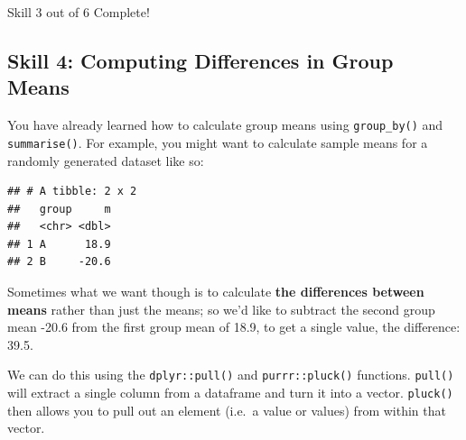 \documentclass[]{book}
\newenvironment{Shaded}{\begin{snugshade}}{\end{snugshade}}
\newcommand{\DataTypeTok}[1]{\textcolor[rgb]{0.13,0.29,0.53}{#1}}
\newcommand{\DecValTok}[1]{\textcolor[rgb]{0.00,0.00,0.81}{#1}}
\newcommand{\KeywordTok}[1]{\textcolor[rgb]{0.13,0.29,0.53}{\textbf{#1}}}
\newcommand{\NormalTok}[1]{#1}
\newcommand{\OperatorTok}[1]{\textcolor[rgb]{0.81,0.36,0.00}{\textbf{#1}}}
\newcommand{\StringTok}[1]{\textcolor[rgb]{0.31,0.60,0.02}{#1}}
\begin{document}
{Skill 3 out of 6 Complete!}

\hypertarget{skill-4-computing-differences-in-group-means}{%
\subsection{Skill 4: Computing Differences in Group Means}\label{skill-4-computing-differences-in-group-means}}

You have already learned how to calculate group means using \texttt{group\_by()} and \texttt{summarise()}. For example, you might want to calculate sample means for a randomly generated dataset like so:

\begin{Shaded}
\end{Shaded}

\begin{verbatim}
## # A tibble: 2 x 2
##   group     m
##   <chr> <dbl>
## 1 A      18.9
## 2 B     -20.6
\end{verbatim}

Sometimes what we want though is to calculate \textbf{the differences between means} rather than just the means; so we'd like to subtract the second group mean -20.6 from the first group mean of 18.9, to get a single value, the difference: 39.5.

We can do this using the \texttt{dplyr::pull()} and \texttt{purrr::pluck()} functions. \texttt{pull()} will extract a single column from a dataframe and turn it into a vector. \texttt{pluck()} then allows you to pull out an element (i.e.~a value or values) from within that vector.
\end{document}

